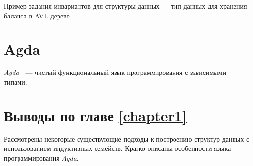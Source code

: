 Пример задания инвариантов для
структуры данных — тип данных для хранения баланса в AVL-дереве \cite{AVLTree}.
\newline


\section{Agda}
\textit{Agda}~\cite{AgdaLang}~---  чистый функциональный язык программирования с зависимыми типами.


\section{Выводы по главе \ref{chapter1}}
Рассмотрены некоторые существующие подходы к построению структур данных
с использованием индуктивных семейств.
Кратко описаны особенности языка программирования \textit{Agda}.

